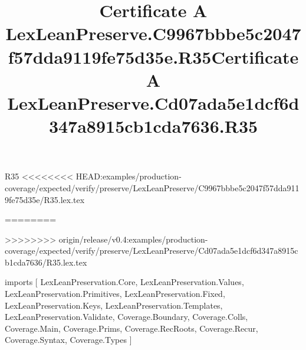 \begin{lexlean}{R35}
<<<<<<<< HEAD:examples/production-coverage/expected/verify/preserve/LexLeanPreserve/C9967bbbe5c2047f57dda9119fe75d35e/R35.lex.tex
\title{Certificate A LexLeanPreserve.C9967bbbe5c2047f57dda9119fe75d35e.R35}
========
\title{Certificate A LexLeanPreserve.Cd07ada5e1dcf6d347a8915cb1cda7636.R35}
>>>>>>>> origin/release/v0.4:examples/production-coverage/expected/verify/preserve/LexLeanPreserve/Cd07ada5e1dcf6d347a8915cb1cda7636/R35.lex.tex
\begin{coremodule}
imports [
  LexLeanPreservation.Core,
  LexLeanPreservation.Values,
  LexLeanPreservation.Primitives,
  LexLeanPreservation.Fixed,
  LexLeanPreservation.Keys,
  LexLeanPreservation.Templates,
  LexLeanPreservation.Validate,
  Coverage.Boundary,
  Coverage.Colls,
  Coverage.Main,
  Coverage.Prims,
  Coverage.RecRoots,
  Coverage.Recur,
  Coverage.Syntax,
  Coverage.Types
]


\end{coremodule}
\end{lexlean}
